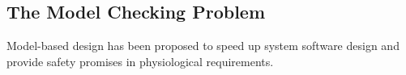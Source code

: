 \subsection{The Model Checking Problem}
Model-based design has been proposed to speed up system software design and provide safety promises in physiological requirements. %
%
